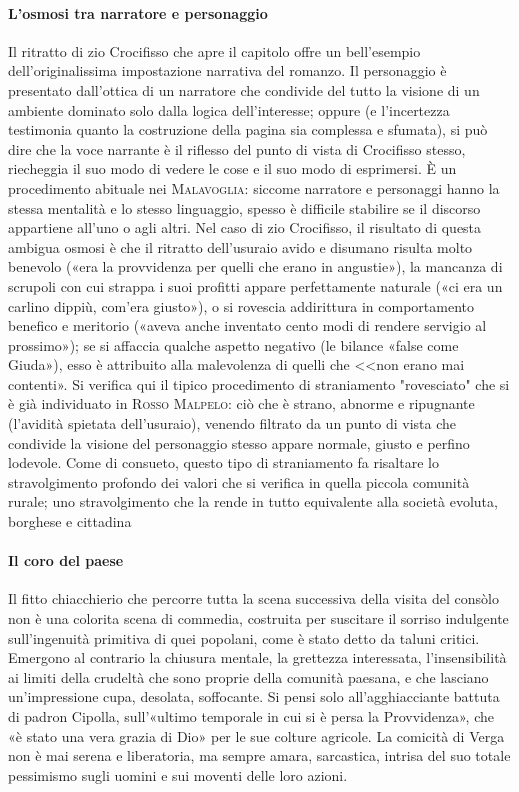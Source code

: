 \documentclass{book}
\newcounter{mar}
\begin{document}
\paragraph{L'osmosi tra narratore e personaggio} Il ritratto di zio Crocifisso che apre il capitolo offre un bell'esempio dell'originalissima impostazione narrativa del romanzo. Il personaggio è presentato dall'ottica di un narratore che condivide del tutto la visione di un ambiente dominato solo dalla logica dell'interesse; oppure (e l'incertezza testimonia quanto la costruzione della pagina sia complessa e sfumata), si può dire che la voce narrante è il riflesso del punto di vista di Crocifisso stesso, riecheggia il suo modo di vedere le cose e il suo modo di esprimersi. È un procedimento abituale nei \textsc{Malavoglia}: siccome narratore e personaggi hanno la stessa mentalità e lo stesso linguaggio, spesso è difficile stabilire se il discorso appartiene all'uno o agli altri. Nel caso di zio Crocifisso, il risultato di questa ambigua osmosi è che il ritratto dell'usuraio avido e disumano risulta molto benevolo («era la provvidenza per quelli che erano in angustie»), la mancanza di scrupoli con cui strappa i suoi profitti appare perfettamente naturale («ci era un carlino dippiù, com'era giusto»), o si rovescia addirittura in comportamento benefico e meritorio («aveva anche inventato cento modi di rendere servigio al prossimo»); se si affaccia qualche aspetto negativo (le bilance «false come Giuda»), esso è attribuito alla malevolenza di quelli che <<non erano mai contenti». Si verifica qui il tipico procedimento di straniamento "rovesciato" che si è già individuato in \textsc{Rosso Malpelo}: ciò che è strano, abnorme e ripugnante (l'avidità spietata dell'usuraio), venendo filtrato da un punto di vista che condivide la visione del personaggio stesso appare normale, giusto e perfino lodevole. Come di consueto, questo tipo di straniamento fa risaltare lo stravolgimento profondo dei valori che si verifica in quella piccola comunità rurale; uno stravolgimento che la rende in tutto equivalente alla società evoluta, borghese e cittadina

\paragraph{Il coro del paese} Il fitto chiacchierio che percorre tutta la scena successiva della visita del consòlo non è una colorita scena di commedia, costruita per suscitare il sorriso indulgente sull'ingenuità primitiva di quei popolani, come è stato detto da taluni critici. Emergono al contrario la chiusura mentale, la grettezza interessata, l'insensibilità ai limiti della crudeltà che sono proprie della comunità paesana, e che lasciano un'impressione cupa, desolata, soffocante. Si pensi solo all'agghiacciante battuta di padron Cipolla, sull'«ultimo temporale in cui si è persa la Provvidenza», che «è stato una vera grazia di Dio» per le sue colture agricole. La comicità di Verga non è mai serena e liberatoria, ma sempre amara, sarcastica, intrisa del suo totale pessimismo sugli uomini e sui moventi delle loro azioni.
\end{document}
